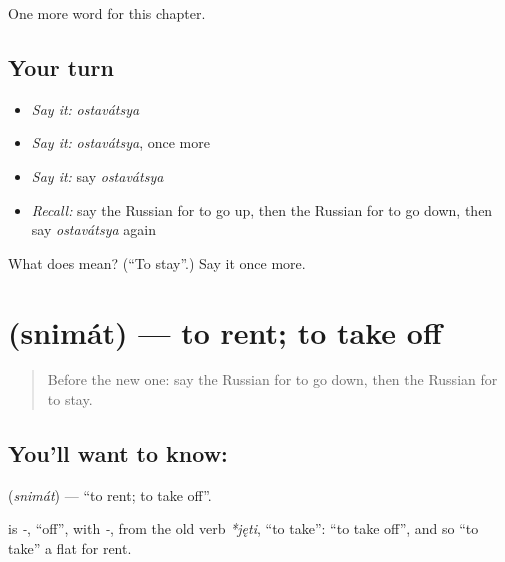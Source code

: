 \begin{grammarlens}[title={What you've built}]
One more word for this chapter.
\end{grammarlens}

\subsection*{Your turn}
\begin{itemize}
\raggedright
  \item \emph{Say it:} \emph{ostavátsya}
  \item \emph{Say it:} \emph{ostavátsya}, once more
  \item \emph{Say it:} say \emph{ostavátsya}
  \item \emph{Recall:} say the Russian for to go up, then the Russian for to go down, then say \emph{ostavátsya} again
\end{itemize}

\begin{tcolorbox}[breakable,colback=teal!4,colframe=teal!35!black,title={Before you move on}]
What does  mean? (\textquotedblleft{}To stay\textquotedblright{}.) Say it once more.
\end{tcolorbox}
\section[\texorpdfstring{\ru{снимать} (snimát)}{снимать (snimát)}]{ (snimát) — to rent; to take off}

\label{lesson:RU-C133-to-rent}



\begin{quote}
Before the new one: say the Russian for to go down, then the Russian for to stay.
\end{quote}

\subsection*{You'll want to know: }
\textbf{} (\emph{snimát}) — \textquotedblleft{}to rent; to take off\textquotedblright{}.

\begin{cousinweb}
\textbf{} is \emph{-}, \textquotedblleft{}off\textquotedblright{}, with \emph{-}, from the old verb \emph{*jęti}, \textquotedblleft{}to take\textquotedblright{}: \textquotedblleft{}to take off\textquotedblright{}, and so \textquotedblleft{}to take\textquotedblright{} a flat for rent.
\end{cousinweb}


